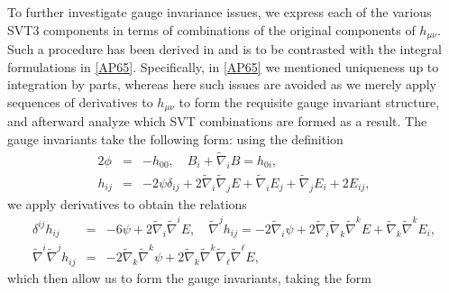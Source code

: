 To further investigate gauge invariance issues, we express each of the various SVT3 components in terms  of combinations of the original components of $h_{\mu\nu}$. Such a procedure has been derived in \cite{amarasinghe_2019} and is to be contrasted with the integral formulations in \eqref{AP65}. Specifically, in \eqref{AP65} we mentioned uniqueness up to integration by parts, whereas here such issues are avoided as we merely apply sequences of derivatives to $h_{\mu\nu}$ to form the requisite gauge invariant structure, and afterward analyze which SVT combinations are formed as a result. The gauge invariants take the following form: using the definition
%
\begin{eqnarray}
2\phi&=&-h_{00},\quad B_i+\tilde{\nabla}_iB=h_{0i},
\nonumber\\
h_{ij}&=&-2\psi\delta_{ij} +2\tilde{\nabla}_i\tilde{\nabla}_j E + \tilde{\nabla}_i E_j + \tilde{\nabla}_j E_i + 2E_{ij},
\label{2.4}
\end{eqnarray}
%
we apply derivatives to obtain the relations
%
\begin{eqnarray}
\delta^{ij}h_{ij}&=&-6\psi+2\tilde{\nabla}_i\tilde{\nabla}^iE,\quad
\tilde{\nabla}^jh_{ij}=-2\tilde{\nabla}_i\psi+2\tilde{\nabla}_i\tilde{\nabla}_k\tilde{\nabla}^kE+\tilde{\nabla}_k\tilde{\nabla}^kE_{i},
\nonumber\\
\tilde{\nabla}^i \tilde{\nabla}^jh_{ij}&=&-2\tilde{\nabla}_k\tilde{\nabla}^k\psi+2\tilde{\nabla}_k\tilde{\nabla}^k\tilde{\nabla}_{\ell}\tilde{\nabla}^{\ell}E,
\label{2.5}
\end{eqnarray}
%
which then allow us to form the gauge invariants, taking the form
%
